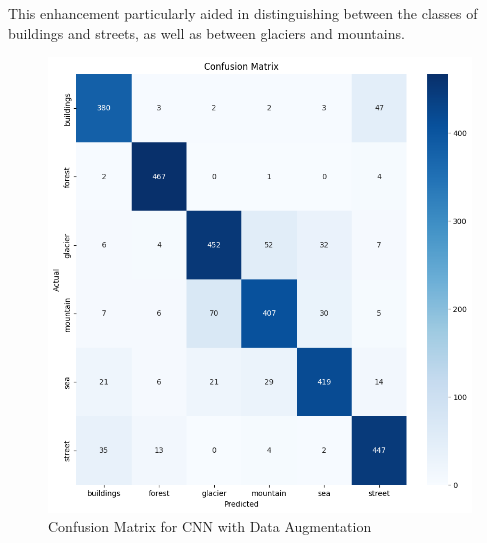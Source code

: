 \documentclass[conference]{IEEEtran}
\begin{document}
This enhancement particularly aided in distinguishing between the classes of buildings and streets, as well as between glaciers and mountains.


\begin{figure}[H]
    \centering
    \includegraphics[width=1\linewidth]{images//CNN/ConfusionMatrix_CNN_Augmented.png}
    \caption{Confusion Matrix for CNN with Data Augmentation}
    \label{fig:CM_CNN_Augmented}
\end{figure}
\end{document}
